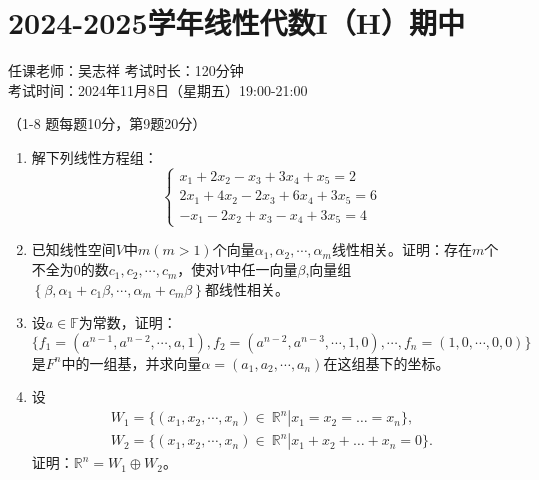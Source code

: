 \section*{2024-2025学年线性代数I（H）期中}

\begin{center}
    任课老师：吴志祥\hspace{4em} 考试时长：120分钟 \\
    考试时间：2024年11月8日（星期五）19:00-21:00
\end{center}

（1-8 题每题10分，第9题20分）

\begin{enumerate}
    \item 解下列线性方程组：
          \[
              \begin{cases}
                  x_1 + 2x_2 - x_3 + 3x_4 +x_5 = 2     \\
                  2x_1 + 4x_2 - 2x_3 + 6x_4 + 3x_5 = 6 \\
                  -x_1 - 2x_2 + x_3 - x_4 + 3x_5 = 4
              \end{cases}
          \]

    \item 已知线性空间\(V\)中\(m(m > 1)\)个向量\(\alpha_1,\alpha_2,\cdots,\alpha_{m}\)线性相关。证明：存在\(m\)个不全为\(0\)的数\(c_1,c_2,\cdots,c_{m}\)，使对\(V\)中任一向量\(\beta\),向量组\(\left\{ \beta,\alpha_1 + c_1\beta,\cdots,\alpha_{m} + c_{m}\beta \right\}\)都线性相关。

    \item 设\(a \in \mathbb{F}\)为常数，证明：
          \[\{ f_1 = \left( a^{n - 1},a^{n - 2},\cdots,a,1 \right),f_2 = \left( a^{n - 2},a^{n - 3},\cdots,1,0 \right),\cdots,f_{n} = (1,0,\cdots,0,0)\}\]
          是\(F^{n}\)中的一组基，并求向量\(\alpha = \left( a_1,a_2,\cdots,a_{n} \right)\)在这组基下的坐标。

    \item 设
          \begin{align*}
              W_1 = \{ \left( x_1,x_2,\cdots,x_{n} \right) \in \left. \ \mathbb{R}^{n} \right|x_1 = x_2 = \ldots = x_{n} \}, \\
              W_2 = \{ \left( x_1,x_2,\cdots,x_{n} \right) \in \left. \ \mathbb{R}^{n} \right|x_1 + x_2 + \ldots + x_{n} = 0 \}.
          \end{align*}
          证明：\(\mathbb{R}^{n} = W_1 \oplus W_2\)。


\end{enumerate}
